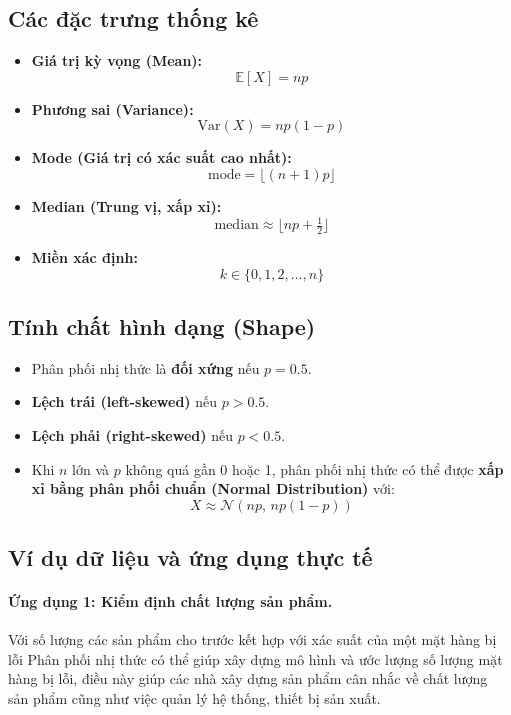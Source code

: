 \subsection{Các đặc trưng thống kê}

\begin{itemize}
    \item \textbf{Giá trị kỳ vọng (Mean):} 
    \[
    \mathbb{E}[X] = np
    \]
    \item \textbf{Phương sai (Variance):} 
    \[
    \mathrm{Var}(X) = np(1 - p)
    \]
    \item \textbf{Mode (Giá trị có xác suất cao nhất):}
    \[
    \mathrm{mode} = \lfloor (n + 1)p \rfloor
    \]
    \item \textbf{Median (Trung vị, xấp xỉ):}
    \[
    \mathrm{median} \approx \lfloor np + \tfrac{1}{2} \rfloor
    \]
    \item \textbf{Miền xác định:}
    \[
    k \in \{0, 1, 2, \dots, n\}
    \]
\end{itemize}

\subsection{Tính chất hình dạng (Shape)}

\begin{itemize}
    \item Phân phối nhị thức là \textbf{đối xứng} nếu $p = 0.5$.  
    \item \textbf{Lệch trái (left-skewed)} nếu $p > 0.5$.  
    \item \textbf{Lệch phải (right-skewed)} nếu $p < 0.5$.  
    \item Khi $n$ lớn và $p$ không quá gần 0 hoặc 1, phân phối nhị thức có thể được \textbf{xấp xỉ bằng phân phối chuẩn (Normal Distribution)} với:
    \[
    X \approx \mathcal{N}(np, \, np(1 - p))
    \]
\end{itemize}

\subsection{Ví dụ dữ liệu và ứng dụng thực tế}

\paragraph{Ứng dụng 1: Kiểm định chất lượng sản phẩm.} 
Với số lượng các sản phẩm cho trước kết hợp với xác suất của một mặt hàng bị lỗi
Phân phối nhị thức có thể giúp xây dựng mô hình và ước lượng số lượng
mặt hàng bị lỗi, điều này giúp các nhà xây dựng sản phẩm cân nhắc về chất lượng
sản phẩm cũng như việc quản lý hệ thống, thiết bị sản xuất.

